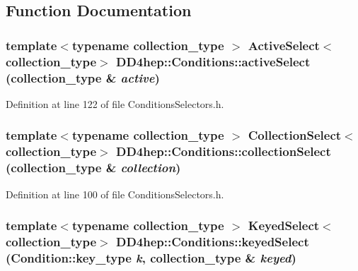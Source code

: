 \subsection{Function Documentation}
\hypertarget{namespace_d_d4hep_1_1_conditions_a652973a7652fc68f7f02011077546526}{
\subsubsection[{activeSelect}]{\setlength{\rightskip}{0pt plus 5cm}template$<$typename collection\_\-type $>$ {\bf ActiveSelect}$<$collection\_\-type$>$ DD4hep::Conditions::activeSelect (collection\_\-type \& {\em active})}}
\label{namespace_d_d4hep_1_1_conditions_a652973a7652fc68f7f02011077546526}


Definition at line 122 of file ConditionsSelectors.h.\hypertarget{namespace_d_d4hep_1_1_conditions_ac4eddf0d558e808e29ad17431cac55df}{
\subsubsection[{collectionSelect}]{\setlength{\rightskip}{0pt plus 5cm}template$<$typename collection\_\-type $>$ {\bf CollectionSelect}$<$collection\_\-type$>$ DD4hep::Conditions::collectionSelect (collection\_\-type \& {\em collection})}}
\label{namespace_d_d4hep_1_1_conditions_ac4eddf0d558e808e29ad17431cac55df}


Definition at line 100 of file ConditionsSelectors.h.\hypertarget{namespace_d_d4hep_1_1_conditions_a268ac177b8108ed7b8dbab4c4ba55499}{
\subsubsection[{keyedSelect}]{\setlength{\rightskip}{0pt plus 5cm}template$<$typename collection\_\-type $>$ {\bf KeyedSelect}$<$collection\_\-type$>$ DD4hep::Conditions::keyedSelect (Condition::key\_\-type {\em k}, \/  collection\_\-type \& {\em keyed})}}
\label{namespace_d_d4hep_1_1_conditions_a268ac177b8108ed7b8dbab4c4ba55499}


